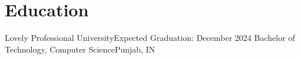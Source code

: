 \section{Education}
    \resumeSubHeadingListStart

    \resumeSubheading
    {Lovely Professional University}{Expected Graduation: December 2024}
    {Bachelor of Technology, Computer Science}{Punjab, IN}
    \resumeItemListStart
    \resumeItemListEnd

    \resumeSubHeadingListEnd